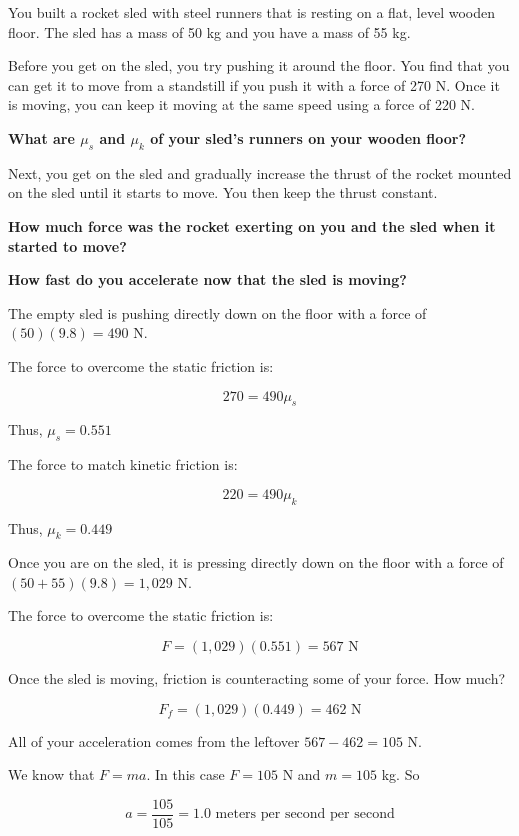 \begin{Exercise}[title={Rocket Sled}, label=rocketsled1]
 
You built a rocket sled with steel runners that is resting on a flat, level wooden floor. The sled has a mass of 50 kg and you have a mass of 55 kg.

Before you get on the sled,  you try pushing it around the floor. You find that you can get it to move from a
standstill if you push it with a force of 270 N.  Once it is moving, you can keep it moving at the same speed using a force of 220 N.

\textbf{What are $\mu_s$ and $\mu_k$ of your sled's runners on your wooden floor?}

Next, you get on the sled and gradually increase the thrust of the rocket mounted on the sled until it starts to move. You then keep the thrust constant.

\textbf{How much force was the rocket exerting on you and the sled when it started to move?}

\textbf{How fast do you accelerate now that the sled is moving?}

\end{Exercise}
\begin{Answer}[ref=rocketsled1]

The empty sled is pushing directly down on the floor with a force of $(50)(9.8) = 490$ N.

The force to overcome the static friction is:

$$270 = 490 \mu_s$$

Thus, $\mu_s = 0.551$

The force to match kinetic friction is:

$$220 = 490 \mu_k$$

Thus, $\mu_k = 0.449$

Once you are on the sled, it is pressing directly down on the floor with a force of $(50 + 55)(9.8) = 1,029$ N.

The force to overcome the static friction is:

$$F = (1,029)(0.551) = 567 \text{ N}$$

Once the sled is moving, friction is counteracting some of your force. How much?

$$F_f = (1,029)(0.449) = 462 \text{ N}$$

All of your acceleration comes from the leftover $567 - 462 = 105$ N.

We know that $F = ma$. In this case $F = 105$ N and $m = 105$ kg. So

$$a = \frac{105}{105} = 1.0 \text{ meters per second per second}$$

\end{Answer}

